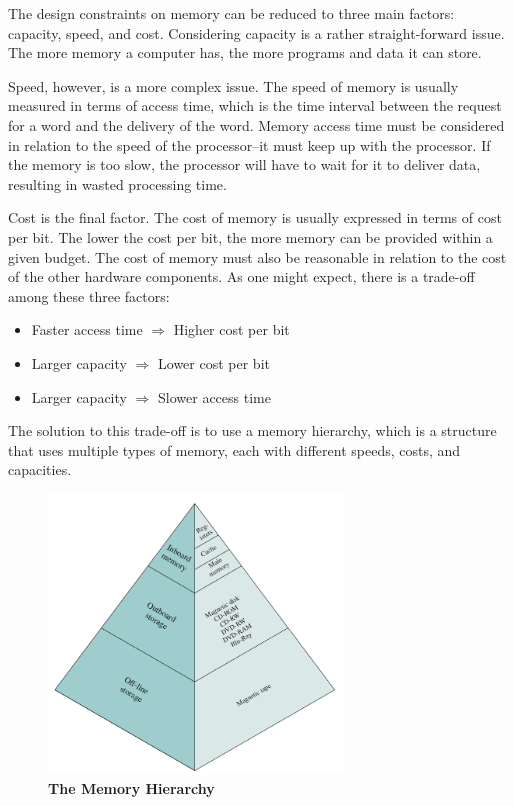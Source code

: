 \documentclass{article}
\begin{document}
The design constraints on memory can be reduced to three main factors: capacity, speed, and cost.
Considering capacity is a rather straight-forward issue. The more memory a computer has, the more programs and data it can store.

Speed, however, is a more complex issue. The speed of memory is usually measured in terms of access time, which is the time interval between the request for a word and the delivery of the word.
Memory access time must be considered in relation to the speed of the processor--it must keep up with the processor. If the memory is too slow, the processor will have to wait for it to deliver data, resulting in wasted processing time.

Cost is the final factor. The cost of memory is usually expressed in terms of cost per bit. The lower the cost per bit, the more memory can be provided within a given budget. The cost of memory must also be reasonable in relation to the cost of the other hardware components.
\newpage
As one might expect, there is a trade-off among these three factors:
\begin{itemize}
    \item Faster access time $\Rightarrow$ Higher cost per bit
    \item Larger capacity $\Rightarrow$ Lower cost per bit
    \item Larger capacity $\Rightarrow$ Slower access time
\end{itemize}

The solution to this trade-off is to use a memory hierarchy, which is a structure that uses multiple types of memory, each with different speeds, costs, and capacities.

\begin{figure}[!h]
    \centering
    \includegraphics[width=0.7\textwidth]{figures/Ch01Figure7.png} %
    \caption{\textbf{The Memory Hierarchy}}
    \label{fig:Ch01Fig7}
\end{figure}
\end{document}
